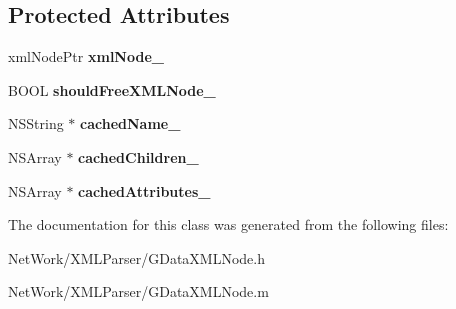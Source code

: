 \subsection*{Protected Attributes}
\begin{DoxyCompactItemize}
\item 
\hypertarget{interface_g_data_x_m_l_node_acfd13d67dcb0ed8011df204c36c88d6f}{xml\+Node\+Ptr {\bfseries xml\+Node\+\_\+}}\label{interface_g_data_x_m_l_node_acfd13d67dcb0ed8011df204c36c88d6f}

\item 
\hypertarget{interface_g_data_x_m_l_node_af6ca9b5845f17e614acc517388e1bfd5}{B\+O\+O\+L {\bfseries should\+Free\+X\+M\+L\+Node\+\_\+}}\label{interface_g_data_x_m_l_node_af6ca9b5845f17e614acc517388e1bfd5}

\item 
\hypertarget{interface_g_data_x_m_l_node_abf237c0ffe4081e69064e6ca858b23c6}{N\+S\+String $\ast$ {\bfseries cached\+Name\+\_\+}}\label{interface_g_data_x_m_l_node_abf237c0ffe4081e69064e6ca858b23c6}

\item 
\hypertarget{interface_g_data_x_m_l_node_a4bf9ed070da05d56e7af4481d7e85c3b}{N\+S\+Array $\ast$ {\bfseries cached\+Children\+\_\+}}\label{interface_g_data_x_m_l_node_a4bf9ed070da05d56e7af4481d7e85c3b}

\item 
\hypertarget{interface_g_data_x_m_l_node_a5681557d48aaa1ed6ba6a5d6488bb6a5}{N\+S\+Array $\ast$ {\bfseries cached\+Attributes\+\_\+}}\label{interface_g_data_x_m_l_node_a5681557d48aaa1ed6ba6a5d6488bb6a5}

\end{DoxyCompactItemize}


The documentation for this class was generated from the following files\+:\begin{DoxyCompactItemize}
\item 
Net\+Work/\+X\+M\+L\+Parser/G\+Data\+X\+M\+L\+Node.\+h\item 
Net\+Work/\+X\+M\+L\+Parser/G\+Data\+X\+M\+L\+Node.\+m\end{DoxyCompactItemize}
